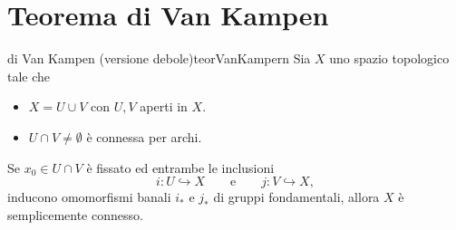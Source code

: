 \section{Teorema di Van Kampen}

\begin{teor}{di Van Kampen (versione debole)}{teorVanKampern}
	Sia \(X\) uno spazio topologico tale che
	\begin{itemize}
		\item \(X=U\cup V\) con \(U,V\) aperti in \(X\).
		\item \(U\cap V\neq \emptyset\) è connessa per archi.
	\end{itemize}
	Se \(x_0\in U\cap V\) è fissato ed entrambe le inclusioni
	\[
		i\colon U \hookrightarrow X \qquad\text{e}\qquad j\colon V \hookrightarrow X,
	\]
	inducono omomorfismi banali \(i_*\) e \(j_*\) di gruppi fondamentali, allora \(X\) è semplicemente connesso.
\end{teor}

